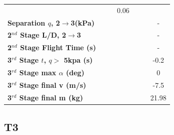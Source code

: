 \begin{table}[ht]
\begin{tabular}{l c c c c c c}
	& \secondthirdSeparationgammamThreeOneHundredFiveNoReturn
	& \secondthirdSeparationgammamThreeOneHundredTenNoReturn
	&0.06
	\\
	\textbf{Separation $q$, 2$\rightarrow$3(kPa)}
	& \secondthirdSeparationqmThreeNinetyNoReturn
	& \secondthirdSeparationqmThreeNinetyFiveNoReturn
	& \secondthirdSeparationqmThreeStandardNoReturn
	& \secondthirdSeparationqmThreeOneHundredFiveNoReturn
	& \secondthirdSeparationqmThreeOneHundredTenNoReturn
	& -
	\\
	\textbf{2$^{nd}$ Stage L/D, 2$\rightarrow$3}
	& \secondthirdSeparationLDmThreeNinetyNoReturn
	& \secondthirdSeparationLDmThreeNinetyFiveNoReturn
	& \secondthirdSeparationLDmThreeStandardNoReturn
	& \secondthirdSeparationLDmThreeOneHundredFiveNoReturn
	& \secondthirdSeparationLDmThreeOneHundredTenNoReturn
	& -
	\\
	\textbf{2$^{nd}$ Stage Flight Time (s)}
	& \secondFlightTimemThreeNinetyNoReturn
	& \secondFlightTimemThreeNinetyFiveNoReturn
	& \secondFlightTimemThreeStandardNoReturn
	& \secondFlightTimemThreeOneHundredFiveNoReturn
	& \secondFlightTimemThreeOneHundredTenNoReturn
	& -
	\\
	\textbf{3$^{rd}$ Stage $t$, $q >$ 5kpa (s)}
	& \thirdqOverFivemThreeNinetyNoReturn
	& \thirdqOverFivemThreeNinetyFiveNoReturn
	& \thirdqOverFivemThreeStandardNoReturn
	& \thirdqOverFivemThreeOneHundredFiveNoReturn
	& \thirdqOverFivemThreeOneHundredTenNoReturn
	&-0.2
	\\
	\textbf{3$^{rd}$ Stage max $\alpha$ (deg)}
	& \thirdmaxAoAmThreeNinetyNoReturn
	& \thirdmaxAoAmThreeNinetyFiveNoReturn
	& \thirdmaxAoAmThreeStandardNoReturn
	& \thirdmaxAoAmThreeOneHundredFiveNoReturn
	& \thirdmaxAoAmThreeOneHundredTenNoReturn
	&0
	\\
	\textbf{3$^{rd}$ Stage final v (m/s)}
	& \thirdcircvmThreeNinetyNoReturn
	& \thirdcircvmThreeNinetyFiveNoReturn
	& \thirdcircvmThreeStandardNoReturn
	& \thirdcircvmThreeOneHundredFiveNoReturn
	& \thirdcircvmThreeOneHundredTenNoReturn
	&-7.5
	\\
	\textbf{3$^{rd}$ Stage final m (kg)}
	& \thirdcircmmThreeNinetyNoReturn
	& \thirdcircmmThreeNinetyFiveNoReturn
	& \thirdcircmmThreeStandardNoReturn
	& \thirdcircmmThreeOneHundredFiveNoReturn
	& \thirdcircmmThreeOneHundredTenNoReturn
	&21.98
	\\
	\hline 
\end{tabular} 
\end{table}

\subsection{T3}

